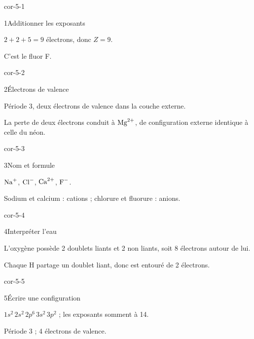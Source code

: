 \clearpage{}
\corrigesSouples
\begin{blocLivre}{cor-5-1}\begin{corrige}{1}{Additionner les exposants}
\begin{questions}
\item $2+2+5=9$ électrons, donc $Z=9$.
\item C’est le fluor F.
\end{questions}
\end{corrige}\end{blocLivre}
\begin{blocLivre}{cor-5-2}\begin{corrige}{2}{Électrons de valence}
\begin{questions}
\item Période 3, deux électrons de valence dans la couche externe.
\item La perte de deux électrons conduit à $\ce{Mg^{2+}}$, de configuration externe identique à celle du néon.
\end{questions}
\end{corrige}\end{blocLivre}
\begin{blocLivre}{cor-5-3}\begin{corrige}{3}{Nom et formule}
\begin{questions}
\item $\ce{Na+}$, $\ce{Cl-}$, $\ce{Ca^{2+}}$, $\ce{F-}$.
\item Sodium et calcium : cations ; chlorure et fluorure : anions.
\end{questions}
\end{corrige}\end{blocLivre}
\begin{blocLivre}{cor-5-4}\begin{corrige}{4}{Interpréter l’eau}
\begin{questions}
\item L’oxygène possède 2 doublets liants et 2 non liants, soit 8 électrons autour de lui.
\item Chaque H partage un doublet liant, donc est entouré de 2 électrons.
\end{questions}
\end{corrige}\end{blocLivre}
\begin{blocLivre}{cor-5-5}\begin{corrige}{5}{Écrire une configuration}
\begin{questions}
\item $1s^2\,2s^2\,2p^6\,3s^2\,3p^2$ ; les exposants somment à 14.
\item Période 3 ; 4 électrons de valence.
\end{questions}
\end{corrige}\end{blocLivre}
